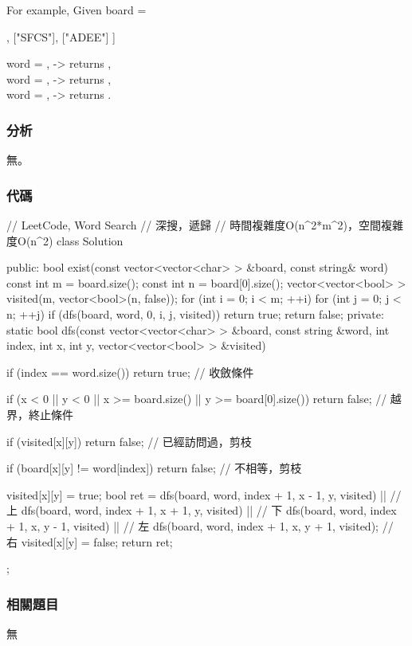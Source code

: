 For example,
Given board =
\begin{Code}
[
  ["ABCE"],
  ["SFCS"],
  ["ADEE"]
]
\end{Code}
word = , -> returns ,\\
word = , -> returns ,\\
word = , -> returns .


\subsubsection{分析}
無。


\subsubsection{代碼}
\begin{Code}
// LeetCode, Word Search
// 深搜，遞歸
// 時間複雜度O(n^2*m^2)，空間複雜度O(n^2)
class Solution {
public:
    bool exist(const vector<vector<char> > &board, const string& word) {
        const int m = board.size();
        const int n = board[0].size();
        vector<vector<bool> > visited(m, vector<bool>(n, false));
        for (int i = 0; i < m; ++i)
            for (int j = 0; j < n; ++j)
                if (dfs(board, word, 0, i, j, visited))
                    return true;
        return false;
    }
private:
    static bool dfs(const vector<vector<char> > &board, const string &word,
            int index, int x, int y, vector<vector<bool> > &visited) {
        if (index == word.size())
            return true; // 收斂條件

        if (x < 0 || y < 0 || x >= board.size() || y >= board[0].size())
            return false;  // 越界，終止條件

        if (visited[x][y]) return false; // 已經訪問過，剪枝

        if (board[x][y] != word[index]) return false; // 不相等，剪枝

        visited[x][y] = true;
        bool ret = dfs(board, word, index + 1, x - 1, y, visited) || // 上
                dfs(board, word, index + 1, x + 1, y, visited)    || // 下
                dfs(board, word, index + 1, x, y - 1, visited)    || // 左
                dfs(board, word, index + 1, x, y + 1, visited);      // 右
        visited[x][y] = false;
        return ret;
    }
};
\end{Code}


\subsubsection{相關題目}
\begindot
\item 無
\myenddot


